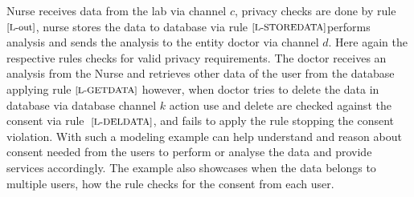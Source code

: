 Nurse receives data from the lab via channel $ c$, privacy checks are done by rule $ \scriptsize \text{[L-out]} $, nurse stores the data to database via  rule $ \scriptsize \text{[L-STOREDATA]} $performs analysis and sends the analysis to the entity doctor via channel $ d$. Here again the respective rules checks for valid privacy requirements. The doctor receives an analysis from the Nurse and retrieves other data of the user from the database applying rule $ \scriptsize \text{[L-GETDATA]}$  however, when doctor tries to delete the data in database via database channel $k$ action use and delete are checked against the consent via rule $ \scriptsize \text{ [L-DELDATA]}$, and fails to apply the rule stopping the consent violation. With such a modeling example can help understand and reason about consent needed from the users to perform or analyse the data and provide services accordingly. The example also showcases when the data belongs to multiple users, how the rule checks for the consent from each  user. 




